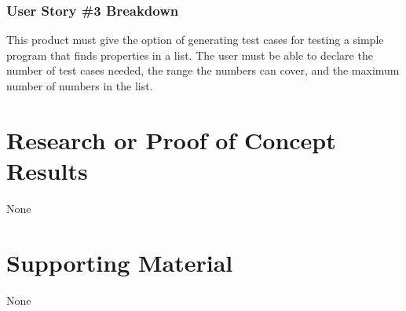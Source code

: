 \subsubsection{User Story \#3 Breakdown}
This product must give the option of generating test cases for testing a simple program that finds properties in a list.  The user must be able to declare the number of test cases needed, the range the numbers can cover, and the maximum number of numbers in the list.


\section{Research or Proof of Concept Results}
None


\section{Supporting Material}
None

